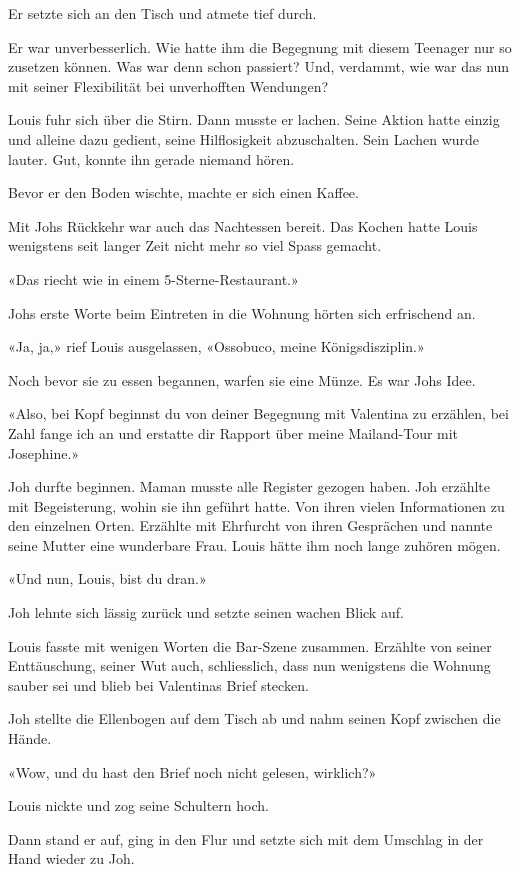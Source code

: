 Er setzte sich an den Tisch und atmete tief durch.

Er war unverbesserlich. Wie hatte ihm die Begegnung mit diesem Teenager
nur so zusetzen können. Was war denn schon passiert? Und, verdammt, wie
war das nun mit seiner Flexibilität bei unverhofften Wendungen?

Louis fuhr sich über die Stirn. Dann musste er lachen. Seine Aktion
hatte einzig und alleine dazu gedient, seine Hilflosigkeit abzuschalten.
Sein Lachen wurde lauter. Gut, konnte ihn gerade niemand hören.

Bevor er den Boden wischte, machte er sich einen Kaffee.

Mit Johs Rückkehr war auch das Nachtessen bereit. Das Kochen hatte Louis
wenigstens seit langer Zeit nicht mehr so viel Spass gemacht.

«Das riecht wie in einem 5-Sterne-Restaurant.»

Johs erste Worte beim Eintreten in die Wohnung hörten sich erfrischend
an.

«Ja, ja,» rief Louis ausgelassen, «Ossobuco, meine Königsdisziplin.»

Noch bevor sie zu essen begannen, warfen sie eine Münze. Es war Johs
Idee.

«Also, bei Kopf beginnst du von deiner Begegnung mit Valentina zu
erzählen, bei Zahl fange ich an und erstatte dir Rapport über meine
Mailand-Tour mit Josephine.»

Joh durfte beginnen. Maman musste alle Register gezogen haben. Joh
erzählte mit Begeisterung, wohin sie ihn geführt hatte. Von ihren vielen
Informationen zu den einzelnen Orten. Erzählte mit Ehrfurcht von ihren
Gesprächen und nannte seine Mutter eine wunderbare Frau. Louis hätte ihm
noch lange zuhören mögen.

«Und nun, Louis, bist du dran.»

Joh lehnte sich lässig zurück und setzte seinen wachen Blick auf.

Louis fasste mit wenigen Worten die Bar-Szene zusammen. Erzählte von
seiner Enttäuschung, seiner Wut auch, schliesslich, dass nun wenigstens
die Wohnung sauber sei und blieb bei Valentinas Brief stecken.

Joh stellte die Ellenbogen auf dem Tisch ab und nahm seinen Kopf
zwischen die Hände.

«Wow, und du hast den Brief noch nicht gelesen, wirklich?»

Louis nickte und zog seine Schultern hoch.

Dann stand er auf, ging in den Flur und setzte sich mit dem Umschlag in
der Hand wieder zu Joh.

